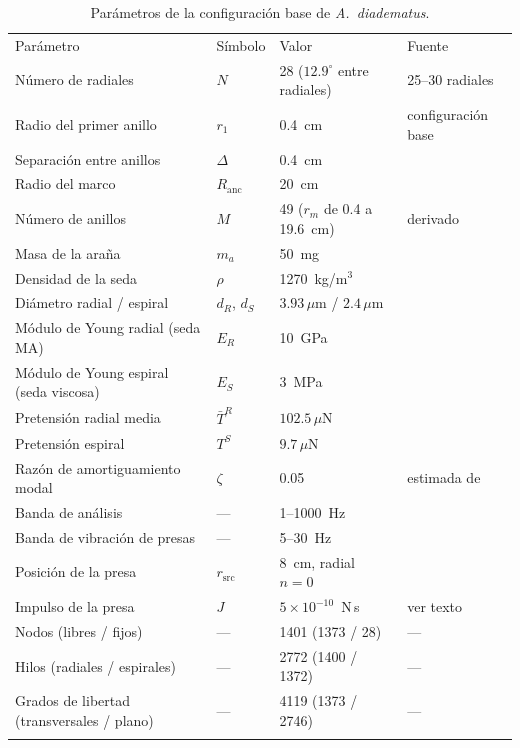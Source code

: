 \documentclass[fleqn,final]{jaes}
\newcommand{\um}{\,\mu\mathrm{m}}
\newcommand{\uN}{\,\mu\mathrm{N}}
\begin{document}
\begin{table}[t]
\centering
\caption{Parámetros de la configuración base de \textit{A.~diadematus}.}\label{tab:param}
\begin{tabular}{@{}llll@{}}
\toprule%
Parámetro & Símbolo & Valor & Fuente \\
\colrule%
Número de radiales & $N$ & 28 ($12.9^\circ$ entre radiales) & 25--30 radiales~\cite{adwAraneus} \\
Radio del primer anillo & $r_1$ & 0.4~cm & configuración base \\
Separación entre anillos & $\Delta$ & 0.4~cm &\cite{yavuz2024} \\
Radio del marco & $R_{\mathrm{anc}}$ & 20~cm &\cite{yavuz2024} \\
Número de anillos & $M$ & 49 ($r_m$ de 0.4 a 19.6~cm) & derivado \\
Masa de la araña & $m_a$ & 50~mg &\cite{yavuz2024} \\
Densidad de la seda & $\rho$ & 1270~kg/m$^3$ &\cite{stauffer1994} \\
Diámetro radial / espiral & $d_R$, $d_S$ & $3.93\um$ / $2.4\um$ &\cite{yavuz2024} \\
Módulo de Young radial (seda MA) & $E_R$ & 10~GPa &\cite{gosline1999} \\
Módulo de Young espiral (seda viscosa) & $E_S$ & 3~MPa &\cite{gosline1999} \\
Pretensión radial media & $\bar T^R$ & $102.5\uN$ &\cite{yavuz2024} \\
Pretensión espiral & $T^S$ & $9.7\uN$ &\cite{yavuz2024} \\
Razón de amortiguamiento modal & $\zeta$ & 0.05 & estimada de~\cite{gosline1999} \\
Banda de análisis & --- & 1--1000~Hz &\cite{landolfa1996,yavuz2024} \\
Banda de vibración de presas & --- & 5--30~Hz &\cite{landolfa1996} \\
Posición de la presa & $r_{\mathrm{src}}$ & 8~cm, radial $n=0$ &\cite{yavuz2024} \\
Impulso de la presa & $J$ & $5\times10^{-10}$~N\,s & ver texto \\
\colrule%
Nodos (libres / fijos) & --- & 1401 (1373 / 28) & --- \\
Hilos (radiales / espirales) & --- & 2772 (1400 / 1372) & --- \\
Grados de libertad (transversales / plano) & --- & 4119 (1373 / 2746) & --- \\
\botrule%
\end{tabular}
\end{table}
\end{document}
